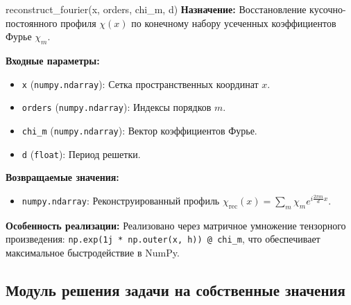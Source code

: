 \documentclass[a4paper,11pt]{article}
\begin{document}
\begin{funcbox}{reconstruct\_fourier(x, orders, chi\_m, d)}
\textbf{Назначение:} Восстановление кусочно-постоянного профиля $\chi(x)$ по конечному набору усеченных коэффициентов Фурье $\chi_m$.

\textbf{Входные параметры:}
\begin{itemize}
    \item \texttt{x} (\texttt{numpy.ndarray}): Сетка пространственных координат $x$.
    \item \texttt{orders} (\texttt{numpy.ndarray}): Индексы порядков $m$.
    \item \texttt{chi\_m} (\texttt{numpy.ndarray}): Вектор коэффициентов Фурье.
    \item \texttt{d} (\texttt{float}): Период решетки.
\end{itemize}

\textbf{Возвращаемые значения:}
\begin{itemize}
    \item \texttt{numpy.ndarray}: Реконструированный профиль $\chi_{\text{rec}}(x) = \sum_{m} \chi_m e^{i \frac{2\pi m}{d} x}$.
\end{itemize}

\textbf{Особенность реализации:} Реализовано через матричное умножение тензорного произведения:
\texttt{np.exp(1j * np.outer(x, h)) @ chi\_m}, что обеспечивает максимальное быстродействие в NumPy.
\end{funcbox}

\subsection{Модуль решения задачи на собственные значения}
\end{document}
